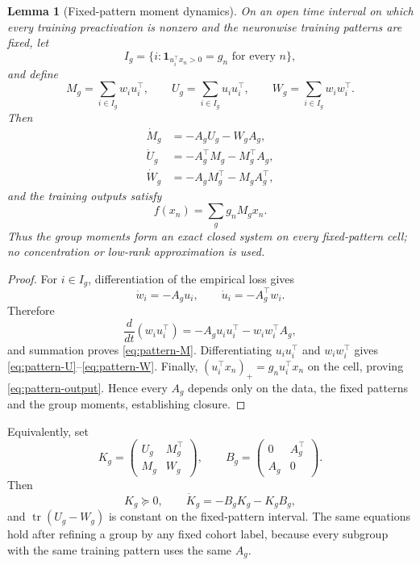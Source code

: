 \documentclass[10pt]{article}
\newtheorem{lemma}[theorem]{Lemma}
\theoremstyle{remark}\newtheorem{remark}[theorem]{Remark}
\begin{document}
\begin{lemma}[Fixed-pattern moment dynamics]
\label{lem:pattern-moment-dynamics}
On an open time interval on which every training preactivation is nonzero and
the neuronwise training patterns are fixed, let
\[
 I_g=\{i:\mathbf1_{u_i^\top x_n>0}=g_n\text{ for every }n\},
\]
and define
\[
 M_g=\sum_{i\in I_g}w_i u_i^\top,\qquad
 U_g=\sum_{i\in I_g}u_i u_i^\top,\qquad
 W_g=\sum_{i\in I_g}w_i w_i^\top.
\]
Then
\begin{align}
 \dot M_g&=-A_gU_g-W_gA_g,\label{eq:pattern-M}\\
 \dot U_g&=-A_g^\top M_g-M_g^\top A_g,\label{eq:pattern-U}\\
 \dot W_g&=-A_gM_g^\top-M_gA_g^\top,\label{eq:pattern-W}
\end{align}
and the training outputs satisfy
\begin{equation}\label{eq:pattern-output}
 f(x_n)=\sum_g g_nM_gx_n.
\end{equation}
Thus the group moments form an exact closed system on every fixed-pattern
cell; no concentration or low-rank approximation is used.
\end{lemma}

\begin{proof}
For $i\in I_g$, differentiation of the empirical loss gives
\[
 \dot w_i=-A_gu_i,\qquad \dot u_i=-A_g^\top w_i.
\]
Therefore
\[
 \frac{d}{dt}(w_iu_i^\top)
 =-A_gu_iu_i^\top-w_iw_i^\top A_g,
\]
and summation proves \eqref{eq:pattern-M}. Differentiating
$u_iu_i^\top$ and $w_iw_i^\top$ gives
\eqref{eq:pattern-U}--\eqref{eq:pattern-W}. Finally,
$(u_i^\top x_n)_+=g_nu_i^\top x_n$ on the cell, proving
\eqref{eq:pattern-output}. Hence every $A_g$ depends only on the data, the
fixed patterns and the group moments, establishing closure.
\end{proof}

Equivalently, set
\[
 K_g=\begin{pmatrix}U_g&M_g^\top\\M_g&W_g\end{pmatrix},\qquad
 B_g=\begin{pmatrix}0&A_g^\top\\A_g&0\end{pmatrix}.
\]
Then
\begin{equation}\label{eq:pattern-Lyapunov}
 K_g\succeq0,\qquad
 \dot K_g=-B_gK_g-K_gB_g,
\end{equation}
and $\operatorname{tr}(U_g-W_g)$ is constant on the fixed-pattern interval.
The same equations hold after refining a group by any fixed cohort label,
because every subgroup with the same training pattern uses the same $A_g$.
\end{document}
